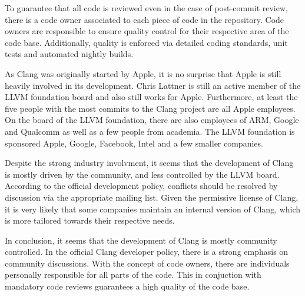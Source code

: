 To guarantee that all code is reviewed even in the case of post-commit review, there is a code owner associated to each piece of code in the repository. Code owners are responsible to ensure quality control for their respective area of the code base. Additionally, quality is enforced via detailed coding standards, unit tests and automated nightly builds.

As Clang was originally started by Apple, it is no surprise that Apple is still heavily involved in its development. Chris Lattner is still an active member of the LLVM foundation board and also still works for Apple.\cite{lattner} Furthermore, at least the five people with the most commits to the Clang project are all Apple employees.\cite{clang-commits} On the board of the LLVM foundation, there are also employees of ARM, Google and Qualcomm as well as a few people from academia.\cite{llvm-board} The LLVM foundation is sponsored Apple, Google, Facebook, Intel and a few smaller companies.\cite{llvm-sponsors}

Despite the strong industry involvment, it seems that the development of Clang is mostly driven by the community, and less controlled by the LLVM board. According to the official development policy, conflicts should be resolved by discussion via the appropriate mailing list.\cite{clang-policy} Given the permissive license of Clang, it is very likely that some companies maintain an internal version of Clang, which is more tailored towards their respective needs.

In conclusion, it seems that the development of Clang is mostly community controlled. In the official Clang developer policy, there is a strong emphasis on community discussions. With the concept of code owners, there are individuals personally responsible for all parts of the code. This in conjuction with mandatory code reviews guarantees a high quality of the code base.



